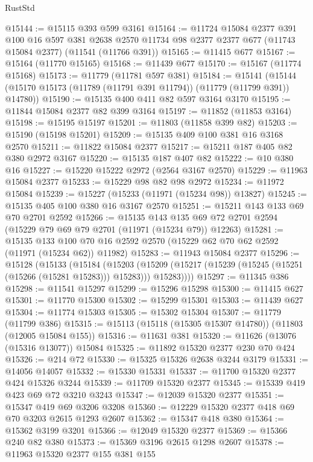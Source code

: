 \begin{lexlean}{RustStd}
\begin{coremodule}
@15144 := @15115 @393 @599 @3161
@15164 := @11724
    @15084
    @2377
    @391
    @100
    @16
    @597
    @381
    @2638
    @2570
    @11734
    @98
    @2377
    @2377
    @677
    (@11743 @15084 @2377)
    (@11541 (@11766 @391))
@15165 := @11415 @677
@15167 := @15164 (@11770 @15165)
@15168 := @11439 @677
@15170 := @15167 (@11774 @15168)
@15173 := @11779 (@11781 @597 @381)
@15184 := @15141
    (@15144 (@15170 @15173 (@11789 (@11791 @391 @11794)) (@11779 (@11799 @391)) @14780))
@15190 := @15135 @400 @411 @82 @597 @3164 @3170
@15195 := @11844 @15084 @2377 @82 @399 @3164
@15197 := @11852 (@11853 @3164)
@15198 := @15195 @15197
@15201 := @11803 (@11858 @399 @82)
@15203 := @15190 (@15198 @15201)
@15209 := @15135 @409 @100 @381 @16 @3168 @2570
@15211 := @11822 @15084 @2377
@15217 := @15211 @187 @405 @82 @380 @2972 @3167
@15220 := @15135 @187 @407 @82
@15222 := @10 @380 @16
@15227 := @15220 @15222 @2972 (@2564 @3167 @2570)
@15229 := @11963 @15084 @2377
@15233 := @15229 @98 @82 @98 @2972
@15234 := @11972 @15084
@15239 := @15227 (@15233 (@11971 (@15234 @98)) @13827)
@15245 := @15135 @405 @100 @380 @16 @3167 @2570
@15251 := @15211 @143 @133 @69 @70 @2701 @2592
@15266 := @15135
    @143
    @135
    @69
    @72
    @2701
    @2594
    (@15229 @79 @69 @79 @2701 (@11971 (@15234 @79)) @12263)
@15281 := @15135
    @133
    @100
    @70
    @16
    @2592
    @2570
    (@15229 @62 @70 @62 @2592 (@11971 (@15234 @62)) @11982)
@15283 := @11943 @15084 @2377
@15296 := @15128
    (@15133
      (@15184
        (@15203
          (@15209 (@15217 (@15239 (@15245 (@15251 (@15266 (@15281 @15283))) @15283))) @15283))))
@15297 := @11345 @386
@15298 := @11541 @15297
@15299 := @15296 @15298
@15300 := @11415 @627
@15301 := @11770 @15300
@15302 := @15299 @15301
@15303 := @11439 @627
@15304 := @11774 @15303
@15305 := @15302 @15304
@15307 := @11779 (@11799 @386)
@15315 := @15113 (@15118 (@15305 @15307 @14780)) (@11803 (@12005 @15084 @155))
@15316 := @11631 @381
@15320 := @11626 (@13076 (@15316 @13077)) @15084
@15325 := @11892 @15320 @2377 @230 @70 @424
@15326 := @214 @72
@15330 := @15325 @15326 @2638 @3244 @3179
@15331 := @14056 @14057
@15332 := @15330 @15331
@15337 := @11700 @15320 @2377 @424 @15326 @3244
@15339 := @11709 @15320 @2377
@15345 := @15339 @419 @423 @69 @72 @3210 @3243
@15347 := @12039 @15320 @2377
@15351 := @15347 @419 @69 @3206 @3208
@15360 := @12229 @15320 @2377 @418 @69 @70 @3203 @2615 @1293 @2607
@15362 := @15347 @418 @380
@15364 := @15362 @3199 @3201
@15366 := @12049 @15320 @2377
@15369 := @15366 @240 @82 @380
@15373 := @15369 @3196 @2615 @1298 @2607
@15378 := @11963 @15320 @2377 @155 @381 @155

\end{coremodule}
\end{lexlean}
